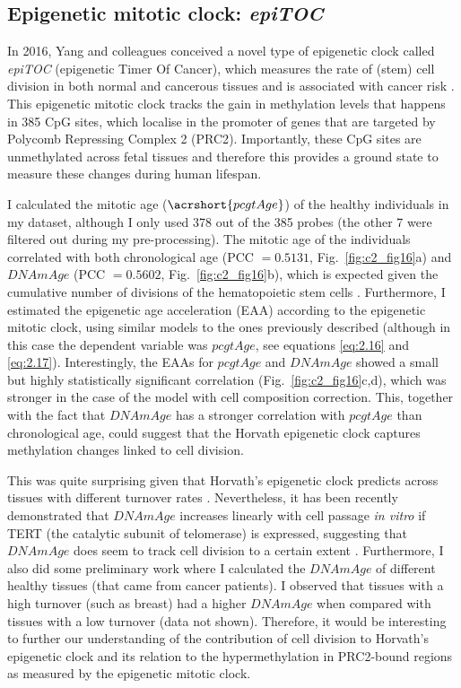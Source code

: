 \subsection{Epigenetic mitotic clock: \textit{epiTOC}} \label{s:2.3.2}

In 2016, Yang and colleagues conceived a novel type of epigenetic clock called \textit{\acrshort{epiTOC}} (epigenetic Timer Of Cancer), which measures the rate of (stem) cell division in both normal and cancerous tissues and is associated with cancer risk \cite{Yang2016}. This epigenetic mitotic clock tracks the gain in methylation levels that happens in 385 CpG sites, which localise in the promoter of genes that are targeted by Polycomb Repressing Complex 2 (\acrshort{PRC2}). Importantly, these CpG sites are unmethylated across fetal tissues and therefore this provides a ground state to measure these changes during human lifespan.

\bigskip

I calculated the mitotic age ($\acrshort{pcgtAge}$) of the healthy individuals in my dataset, although I only used 378 out of the 385 probes (the other 7 were filtered out during my pre-processing). The mitotic age of the individuals correlated with both chronological age (PCC $= 0.5131$, Fig.~\ref{fig:c2_fig16}a) and $DNAmAge$ (PCC $= 0.5602$, Fig.~\ref{fig:c2_fig16}b), which is expected given the cumulative number of divisions of the hematopoietic stem cells \cite{Beerman2013}. Furthermore, I estimated the epigenetic age acceleration (EAA) according to the epigenetic mitotic clock, using similar models to the ones previously described (although in this case the dependent variable was $pcgtAge$, see equations \ref{eq:2.16} and \ref{eq:2.17}). Interestingly, the EAAs for $pcgtAge$ and $DNAmAge$ showed a small but highly statistically significant correlation (Fig.~\ref{fig:c2_fig16}c,d), which was stronger in the case of the model with cell composition correction. This, together with the fact that $DNAmAge$ has a stronger correlation with $pcgtAge$ than chronological age, could suggest that the Horvath epigenetic clock captures methylation changes linked to cell division. 

\bigskip

This was quite surprising given that Horvath's epigenetic clock predicts across tissues with different turnover rates \cite{Yang2016}. Nevertheless, it has been recently demonstrated that $DNAmAge$ increases linearly with cell passage \textit{in vitro} if TERT (the catalytic subunit of telomerase) is expressed, suggesting that $DNAmAge$ does seem to track cell division to a certain extent \cite{Lu2018}. Furthermore, I also did some preliminary work where I calculated the $DNAmAge$ of different healthy tissues (that came from cancer patients). I observed that tissues with a high turnover (such as breast) \cite{Horvath2013,Sehl2017} had a higher $DNAmAge$ when compared with tissues with a low turnover (data not shown). Therefore, it would be interesting to further our understanding of the contribution of cell division to Horvath's epigenetic clock and its relation to the hypermethylation in PRC2-bound regions as measured by the epigenetic mitotic clock.    


